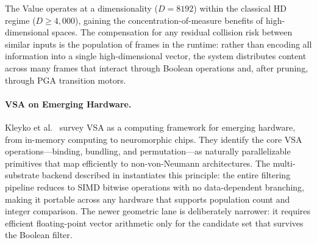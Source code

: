 The Value operates at a dimensionality ($D = 8192$) within the classical
HD regime ($D \ge 4{,}000$), gaining the concentration-of-measure
benefits of high-dimensional spaces.  The compensation for any residual
collision risk between similar inputs is the population of frames in
the runtime: rather than encoding all information into a single
high-dimensional vector, the system distributes content across many
frames that interact through Boolean operations and, after pruning,
through PGA transition motors.

\paragraph{VSA on Emerging Hardware.}
Kleyko et al.\ \citep{kleyko2022vsa} survey VSA as a computing framework
for emerging hardware, from in-memory computing to neuromorphic chips.
They identify the core VSA operations---binding, bundling, and
permutation---as naturally parallelizable primitives that map efficiently
to non-von-Neumann architectures.  The multi-substrate backend described
in  instantiates this principle: the entire
filtering pipeline reduces to SIMD bitwise operations with no
data-dependent branching, making it portable across any hardware that
supports population count and integer comparison.  The newer geometric
lane is deliberately narrower: it requires efficient floating-point
vector arithmetic only for the candidate set that survives the Boolean
filter.
